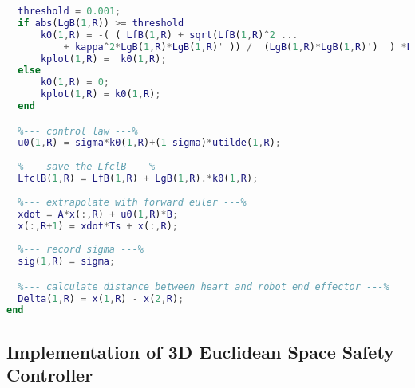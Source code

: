 \begin{lstlisting}[language=matlab]
  %--- Find safe controller ---%
  threshold = 0.001;
  if abs(LgB(1,R)) >= threshold
      k0(1,R) = -( ( LfB(1,R) + sqrt(LfB(1,R)^2 ...
          + kappa^2*LgB(1,R)*LgB(1,R)' )) /  (LgB(1,R)*LgB(1,R)')  ) *LgB(1,R);
      kplot(1,R) =  k0(1,R);
  else
      k0(1,R) = 0;
      kplot(1,R) = k0(1,R);
  end 

  %--- control law ---%
  u0(1,R) = sigma*k0(1,R)+(1-sigma)*utilde(1,R);
  
  %--- save the LfclB ---%  
  LfclB(1,R) = LfB(1,R) + LgB(1,R).*k0(1,R);
  
  %--- extrapolate with forward euler ---%
  xdot = A*x(:,R) + u0(1,R)*B;
  x(:,R+1) = xdot*Ts + x(:,R);
  
  %--- record sigma ---%
  sig(1,R) = sigma;

  %--- calculate distance between heart and robot end effector ---%
  Delta(1,R) = x(1,R) - x(2,R);
end
\end{lstlisting}

\subsection{Implementation of 3D Euclidean Space Safety Controller}\label{sec:app:3d}

